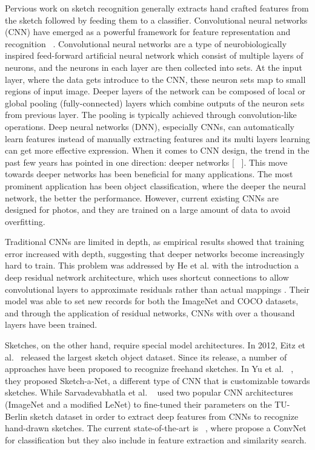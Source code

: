 \documentclass[10pt,twocolumn,letterpaper]{article}
\begin{document}
Pervious work on sketch recognition generally extracts hand crafted features from the sketch followed by feeding them to a classifier.  Convolutional neural networks (CNN) have emerged as a powerful framework for feature representation and recognition ~\cite{krizhevsky2012imagenet}.  Convolutional neural networks are a type of neurobiologically inspired feed-forward artificial neural network which consist of multiple layers of neurons,  and  the neurons in each layer are then collected into sets. At the input layer, where the data gets introduce to the CNN, these neuron sets map to small regions of input image. Deeper layers of the network can be composed of local or global pooling (fully-connected) layers which combine outputs of the neuron sets from previous layer. The pooling is typically achieved through convolution-like operations. Deep neural networks (DNN), especially CNNs, can automatically learn features instead of manually extracting features and its multi layers learning can get more effective expression. When it comes to CNN design, the trend in the past few years has pointed in one direction: deeper networks [ ~\cite{krizhevsky2012imagenet}]. This move towards deeper networks  has been beneficial for many applications. The most prominent application has been object classification, where the deeper the neural network, the better the performance. However, current existing CNNs are designed for photos, and they are trained on a large amount of data to avoid overfitting. 

Traditional CNNs are limited in depth, as empirical results showed that training error increased with depth, suggesting that deeper networks become increasingly hard to train. This problem was addressed by He et al. with the introduction a deep residual network architecture, which uses shortcut connections to allow convolutional layers to approximate residuals rather than actual mappings \cite{hekaming2016}. Their model was able to set new records for both the ImageNet and COCO datasets, and through the application of residual networks, CNNs with over a thousand layers have been trained.

Sketches, on the other hand, require special model architectures. In 2012, Eitz et al.~\cite{eitz2012hdhso} released the largest sketch object dataset. Since its release, a number of approaches have been proposed to recognize freehand sketches.  In Yu et al. ~\cite{yu2016sketch}, they proposed Sketch-a-Net, a different type of CNN that is customizable towards sketches. While Sarvadevabhatla et al. ~\cite{sarvadevabhatla2015freehand} used two popular CNN architectures (ImageNet and a modified LeNet) to fine-tuned their parameters on the TU-Berlin sketch dataset in order to extract deep features from CNNs to recognize hand-drawn sketches. The current state-of-the-art is ~\cite{seddati2016deepsketch}, where propose a ConvNet for classification but they also include in feature extraction and similarity search. 
\end{document}
